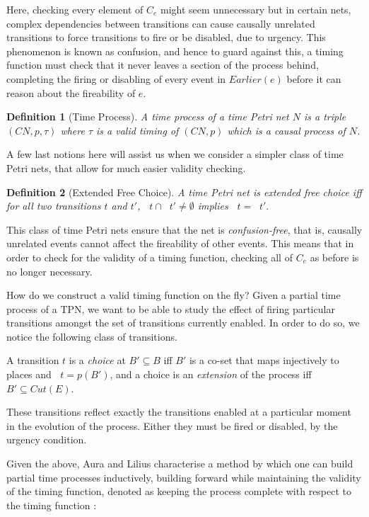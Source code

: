 \documentclass[conference]{IEEEtran}
\DeclareMathOperator*{\pre}{^\bullet}
\newtheorem{definition}{Definition}
\begin{document}
	Here, checking every element of $C_e$ might seem unnecessary but in certain nets, complex dependencies between transitions can cause causally unrelated transitions to force transitions to fire or be disabled, due to urgency. 
	This phenomenon is known as confusion, and hence to guard against this, a timing function must check that it never leaves a section of the process behind, completing the firing or disabling of every event in $Earlier(e)$ before it can reason about the fireability of $e$. 
	
	\begin{definition}[Time Process] \label{tp} A \textit{time process} of a time Petri net $N$ is a triple $(CN, p, \tau)$ where $\tau$ is a valid timing of $(CN, p)$ which is a causal process of $N$. 
	\end{definition}
	
	A few last notions here will assist us when we consider a simpler class of time Petri nets, that allow for much easier validity checking. 
	
	\begin{definition}[Extended Free Choice]\label{efc} A time Petri net is \textit{extended free choice} iff for all two transitions $t$ and $t'$, $\pre t \cap \pre t' \neq \emptyset$ implies $\pre t = \pre t'.$
	\end{definition}
	
	This class of time Petri nets ensure that the net is \textit{confusion-free}, that is, causally unrelated events cannot affect the fireability of other events. 
	This means that in order to check for the validity of a timing function, checking all of $C_e$ as before is no longer necessary. 
	
	How do we construct a valid timing function on the fly? 
	Given a partial time process of a TPN, we want to be able to study the effect of firing particular transitions amongst the set of transitions currently enabled. 
	In order to do so, we notice the following class of transitions. 
	
	A transition $t$ is a \textit{choice} at $B' \subseteq B$ iff $B'$ is a co-set that maps injectively to places and $\pre t = p(B')$, and a choice is an \textit{extension} of the process iff $B' \subseteq Cut(E)$. 
	
	These transitions reflect exactly the transitions enabled at a particular moment in the evolution of the process. Either they must be fired or disabled, by the urgency condition. 
	
	Given the above, Aura and Lilius characterise a method by which one can build partial time processes inductively, building forward while maintaining the validity of the timing function, denoted as keeping the process complete with respect to the timing function : 
	
\end{document}
